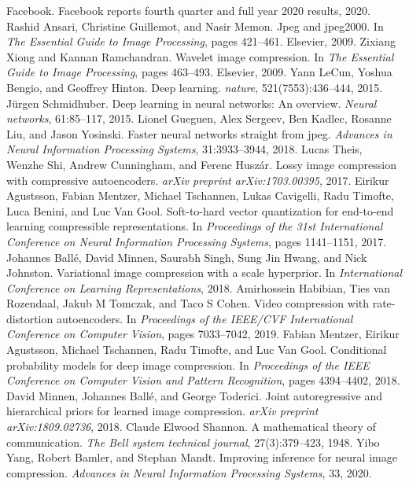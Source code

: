 \begin{chapterreferences}
 Facebook. Facebook reports fourth quarter and full year 2020 results, 2020.
 Rashid Ansari, Christine Guillemot, and Nasir Memon. Jpeg and jpeg2000. In \emph{The Essential Guide to Image Processing}, pages 421–461. Elsevier, 2009.
 Zixiang Xiong and Kannan Ramchandran. Wavelet image compression. In \emph{The Essential Guide to Image Processing}, pages 463–493. Elsevier, 2009.
 Yann LeCun, Yoshua Bengio, and Geoffrey Hinton. Deep learning. \emph{nature}, 521(7553):436–444, 2015.
 Jürgen Schmidhuber. Deep learning in neural networks: An overview. \emph{Neural networks}, 61:85–117, 2015.
 Lionel Gueguen, Alex Sergeev, Ben Kadlec, Rosanne Liu, and Jason Yosinski. Faster neural networks straight from jpeg. \emph{Advances in Neural Information Processing Systems}, 31:3933–3944, 2018.
 Lucas Theis, Wenzhe Shi, Andrew Cunningham, and Ferenc Huszár. Lossy image compression with compressive autoencoders. \emph{arXiv preprint arXiv:1703.00395}, 2017.
 Eirikur Agustsson, Fabian Mentzer, Michael Tschannen, Lukas Cavigelli, Radu Timofte, Luca Benini, and Luc Van Gool. Soft-to-hard vector quantization for end-to-end learning compressible representations. In \emph{Proceedings of the 31st International Conference on Neural Information Processing Systems}, pages 1141–1151, 2017.
 Johannes Ballé, David Minnen, Saurabh Singh, Sung Jin Hwang, and Nick Johnston. Variational image compression with a scale hyperprior. In \emph{International Conference on Learning Representations}, 2018.
 Amirhossein Habibian, Ties van Rozendaal, Jakub M Tomczak, and Taco S Cohen. Video compression with rate-distortion autoencoders. In \emph{Proceedings of the IEEE/CVF International Conference on Computer Vision}, pages 7033–7042, 2019.
 Fabian Mentzer, Eirikur Agustsson, Michael Tschannen, Radu Timofte, and Luc Van Gool. Conditional probability models for deep image compression. In \emph{Proceedings of the IEEE Conference on Computer Vision and Pattern Recognition}, pages 4394–4402, 2018.
 David Minnen, Johannes Ballé, and George Toderici. Joint autoregressive and hierarchical priors for learned image compression. \emph{arXiv preprint arXiv:1809.02736}, 2018.
 Claude Elwood Shannon. A mathematical theory of communication. \emph{The Bell system technical journal}, 27(3):379–423, 1948.
 Yibo Yang, Robert Bamler, and Stephan Mandt. Improving inference for neural image compression. \emph{Advances in Neural Information Processing Systems}, 33, 2020.

\end{chapterreferences}
